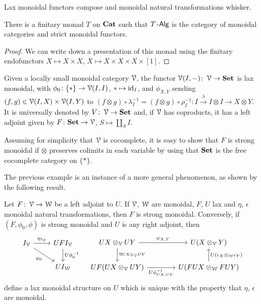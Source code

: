 \documentclass[a4paper,11pt,oneside,openany]{scrbook}
\begin{document}
\begin{prop}
	Lax monoidal functors compose and monoidal natural transformations whisker.
\end{prop}

\begin{prop}
	There is a finitary monad $T$ on ${\normalfont\textbf{Cat}}$ such that $T\operatorname{-\mathsf{Alg}}$ is the category of monoidal categories and strict monoidal functors.
\end{prop}

\begin{proof}
	We can write down a presentation of this monad using the finitary endofunctors $X\mapsto X\times X$, $X\mapsto X\times X\times X\times [1]$.
\end{proof}

\begin{exmp}
	Given a locally small monoidal category $\operatorname{\mathcal{V}}$, the functor
    $\operatorname{\mathcal{V}}(I,-)\colon\operatorname{\mathcal{V}}\rightarrow{\normalfont\textbf{Set}}$ is lax monoidal, with
    $\phi_0\colon\{*\}\rightarrow\operatorname{\mathcal{V}}(I,I)$, $*\mapsto\operatorname{id}_{I}$, and $\phi_{X,Y}$
    sending $(f,g)\in\operatorname{\mathcal{V}}(I,X)\times\operatorname{\mathcal{V}}(I,Y)$ to $(f\otimes
    g)\circ\lambda_I^{-1}=(f\otimes g)\circ\rho_I^{-1}\colon
    I\xrightarrow{\lambda} I\otimes I\rightarrow X\otimes Y$. It is universally denoted by $V\colon\operatorname{\mathcal{V}}\rightarrow{\normalfont\textbf{Set}}$ and, if $\operatorname{\mathcal{V}}$ has coproducts, it has a left adjoint given by $F\colon{\normalfont\textbf{Set}}\rightarrow\operatorname{\mathcal{V}}$, $S\mapsto\amalg_S I$.

	Assuming for simplicity that $\operatorname{\mathcal{V}}$ is cocomplete, it is easy to show that $F$ is strong monoidal if $\otimes$ preserves colimits in each variable by using that ${\normalfont\textbf{Set}}$ is the free cocomplete category on $\{*\}$.
\end{exmp}

The previous example is an instance of a more general phenomenon, as shown by the following result.

\begin{thm}
	Let $F\colon\operatorname{\mathcal{V}}\rightarrow\operatorname{\mathcal{W}}$ be a left adjoint to $U$. If $\operatorname{\mathcal{V}}$, $\operatorname{\mathcal{W}}$ are monoidal, $F$, $U$ lax and $\eta$, $\epsilon$ monoidal natural transformations, then $F$ is strong monoidal. Conversely, if $(F,\phi_0,\phi)$ is strong monoidal and $U$ is any right adjoint, then
	\[
		\begin{tikzcd}
			I_{\V}\ar[r, "\eta_{I_{\V}}"]\ar[dr, "\psi_0", swap]
			& UFI_{\V}\ar[d, "U\phi_0^{-1}"] \\
			& UI_{\W}
		\end{tikzcd}
		\quad
        \begin{tikzcd}[column sep=4em]
            UX\otimes_{\V}UY\ar[r, "\psi_{X,Y}"]\ar[d, "\eta_{UX\otimes_{\V}UY}"]
			& U(X\otimes_{\V}Y) \\
			UF(UX\otimes_{\V}UY)\ar[r, "U\phi^{-1}_{UX,UY}", swap]
            & U(FUX\otimes_{\W}FUY)\ar[u,"U(\epsilon_X\otimes_{\W}\epsilon_Y)", swap]
		\end{tikzcd}
	\]
	define a lax monoidal structure on $U$ which is unique with the property that $\eta$, $\epsilon$ are monoidal.
\end{thm}
\end{document}
